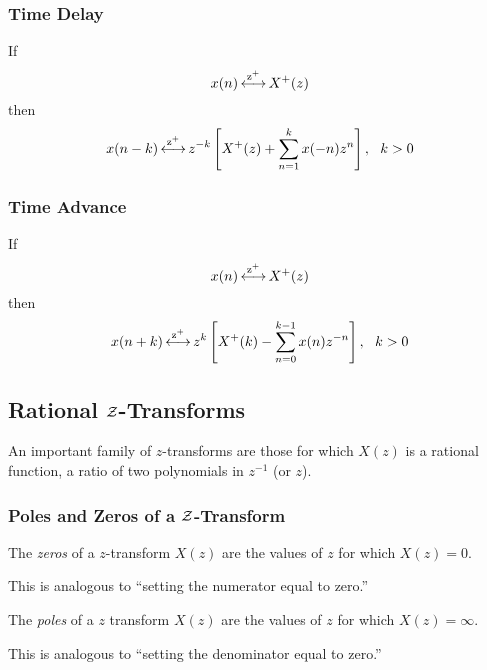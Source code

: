 \subsubsection{Time Delay}\label{subsubsec:One-Sided_Z-Transform_Properties-Time_Delay}
If
\begin{equation*}
  x(n) \operatorname{\overset{z^{+}}{\longleftrightarrow}} X^{+}(z)
\end{equation*}
then
\begin{equation}\label{eq:One-Sided_Z-Transform_Properties-Time_Delay}
  x(n-k) \operatorname{\overset{z^{+}}{\longleftrightarrow}} z^{-k} \left[ X^{+}(z) + \sum\limits_{n=1}^{k}x(-n)z^{n} \right], \:\:\: k>0
\end{equation}

\subsubsection{Time Advance}\label{subsubsec:One-Sided_Z-Transform_Properties-Time_Advance}
If
\begin{equation*}
  x(n) \operatorname{\overset{z^{+}}{\longleftrightarrow}} X^{+}(z)
\end{equation*}
then
\begin{equation}\label{eq:One-Sided_Z-Transform_Properties-Time_Advance}
  x(n+k) \operatorname{\overset{z^{+}}{\longleftrightarrow}} z^{k} \left[ X^{+}(k) - \sum\limits_{n=0}^{k-1}x(n) z^{-n} \right], \:\:\: k>0
\end{equation}

\subsection{Rational \texorpdfstring{$\operatorname{\mathcal{Z}}$-Transforms}{Z-Transform}}\label{subsec:Rational Z-Transforms}
An important family of $z$-transforms are those for which $X(z)$ is a rational function, a ratio of two polynomials in $z^{-1}$ (or $z$).

\subsubsection{Poles and Zeros of a \texorpdfstring{$\operatorname{\mathcal{Z}}$-Transform}{Z-Transform}}\label{subsubsec:Poles and Zeros of Z-Transform}
\begin{definition}[Zeros]\label{def:Zeros of a Z-Transform}
  The \emph{zeros} of a $z$-transform $X(z)$ are the values of $z$ for which $X(z)=0$.

  This is analogous to ``setting the numerator equal to zero.''
\end{definition}
\begin{definition}[Poles]\label{def:Poles of a Z-Transform}
  The \emph{poles} of a $z$ transform $X(z)$ are the values of $z$ for which $X(z)=\infty$.

  This is analogous to ``setting the denominator equal to zero.''
\end{definition}

